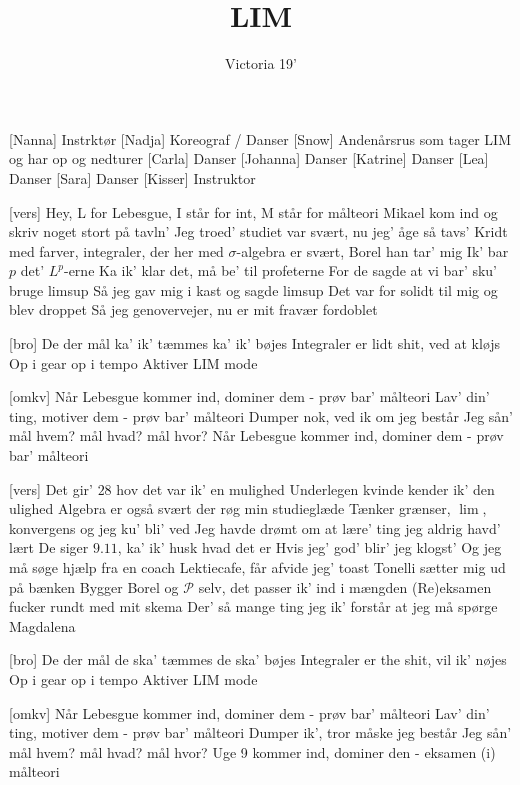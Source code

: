 \documentclass[a4paper,11pt]{article}
\title{LIM}
\author{Victoria 19'}
\begin{document}
\maketitle

\begin{roles}
[Nanna] Instrktør
[Nadja] Koreograf / Danser
[Snow] Andenårsrus som tager LIM og har op og nedturer
[Carla] Danser
[Johanna] Danser
[Katrine] Danser
[Lea] Danser
[Sara] Danser
[Kisser] Instruktor
\end{roles}

\begin{song}
  [vers]%
  Hey, L for Lebesgue, I står for int, M står for målteori
Mikael kom  ind og skriv noget stort på tavln’
Jeg troed’ studiet var svært, nu jeg' åge så tavs’
Kridt med farver, integraler, der her med $\sigma$-algebra er svært, Borel han tar' mig
Ik' bar $p$ det' $L^p$-erne 
Ka ik' klar det, må be' til profeterne
For de sagde at vi bar' sku' bruge limsup
Så jeg gav mig i kast og sagde limsup
Det var for solidt til mig og blev droppet
Så jeg genovervejer, nu er mit fravær fordoblet 

[bro]%
De der mål ka' ik' tæmmes ka' ik' bøjes
Integraler er lidt shit, ved at kløjs 
Op i gear op i tempo
Aktiver LIM mode

[omkv]%
Når Lebesgue kommer ind, dominer dem - prøv bar’ målteori
Lav’ din’ ting, motiver dem - prøv bar’ målteori
Dumper nok, ved ik om jeg består
Jeg sån’ mål hvem? mål hvad? mål hvor?
Når Lebesgue kommer ind, dominer dem - prøv bar’ målteori

[vers]%
Det gir' $28$ hov det var ik' en mulighed
Underlegen kvinde kender ik' den ulighed 
Algebra er også svært der røg min studieglæde
Tænker grænser, $\lim$, konvergens og jeg ku' bli' ved
Jeg havde drømt om at lære' ting jeg aldrig havd' lært
De siger $9.11$, ka' ik' husk hvad det er
Hvis jeg' god' blir' jeg klogst'
Og jeg må søge hjælp fra en coach
Lektiecafe, får afvide jeg' toast
Tonelli sætter mig ud på bænken 
Bygger Borel og $\mathcal{P}$ selv, det passer ik' ind i mængden
(Re)eksamen fucker rundt med mit skema
Der' så mange ting jeg ik' forstår at jeg må spørge Magdalena 

[bro]%
De der mål de ska' tæmmes de ska' bøjes
Integraler er the shit, vil ik' nøjes
Op i gear op i tempo
Aktiver LIM mode

[omkv]%
Når Lebesgue kommer ind, dominer dem - prøv bar’ målteori
Lav’ din’ ting, motiver dem - prøv bar’ målteori
Dumper ik', tror måske jeg består
Jeg sån’ mål hvem? mål hvad? mål hvor?
Uge 9 kommer ind, dominer den - eksamen (i) målteori


\end{song}
\end{document}
